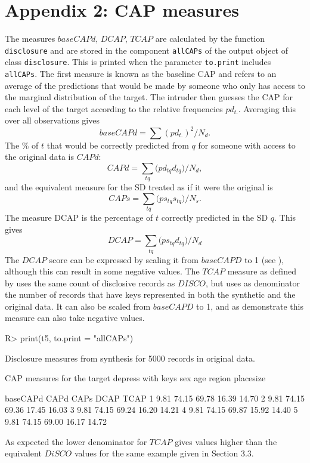 \documentclass[12pt]{article}
\renewcommand{\baselinestretch}{1.5} %
\begin{document}
\section*{Appendix 2: CAP measures }{\label{sec:app2}}

The measures $baseCAPd$, $DCAP$, $TCAP$ are calculated by the function \texttt{disclosure} and are stored in the component \texttt{allCAPs} of the output object of class \texttt{disclosure}. This is printed when the parameter \texttt{to.print} includes \texttt{allCAPs}. The first measure is known as the baseline CAP and refers to an average of the predictions that would be made by someone who only has access to the marginal distribution of the target. The intruder then guesses the CAP for each level of the target according to the relative frequencies $pd_{t.}$. Averaging this over all observations gives
\begin{equation}
  \nonumber baseCAPd = \sum{(pd_{t.})^2}/N_d.
\end{equation}
The \% of $t$ that would be correctly predicted from $q$ for someone with access to the original data is $CAPd$:
\begin{equation}
  \nonumber CAPd = \sum\limits_{tq}{(pd_{tq}}d_{tq})/N_d,
\end{equation}
and the equivalent measure for the SD treated as if it were the original is
\begin{equation}
  \nonumber CAPs = \sum\limits_{tq}{(ps_{tq}}s_{tq})/N_s.
\end{equation}
The measure  DCAP is the percentage of $t$ correctly predicted in the SD  $q$. This gives
\begin{equation}
  \nonumber DCAP = \sum\limits_{tq}{(ps_{tq}}d_{tq})/N_d
\end{equation}
The $DCAP$ score can be expressed  by scaling it from  $baseCAPD$ to 1 (see \cite{little2022,lotte}), although this can result in some negative values.
The $TCAP$ measure as defined by \cite{little2022} uses the same count of disclosive records
as $DISCO$, but uses as denominator the number of records that have keys represented in both the synthetic and the original data. It can also be scaled from $baseCAPD$ to 1,
and as \cite{little2022} demonstrate this measure can also take negative values.
\renewcommand{\baselinestretch}{1.0}
\begin{Schunk}
\begin{Sinput}
R> print(t5, to.print = "allCAPs")
\end{Sinput}
\begin{Soutput}
Disclosure measures from synthesis for 5000 records in original data.

CAP measures for the target depress with keys
sex age region placesize 

  baseCAPd  CAPd  CAPs  DCAP  TCAP
1     9.81 74.15 69.78 16.39 14.70
2     9.81 74.15 69.36 17.45 16.03
3     9.81 74.15 69.24 16.20 14.21
4     9.81 74.15 69.87 15.92 14.40
5     9.81 74.15 69.00 16.17 14.72
\end{Soutput}
\end{Schunk}
\renewcommand{\baselinestretch}{1.5}
As expected the lower denominator for $TCAP$ gives values higher than the equivalent $DiSCO$ values for the same example given in Section 3.3.
\end{document}
